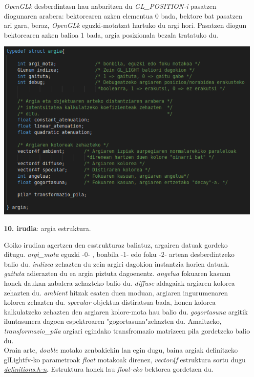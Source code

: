 \documentclass[12pt]{article}
\newcommand{\fitxategi}[1] {\underline{\textit{#1}}}
\newcommand{\aldagai}[1] {\textit{#1}}
\begin{document}
\aldagai{OpenGLk} desberdintasn hau nabaritzen du \aldagai{GL\_POSITION-i} pasatzen diogunaren arabera: bektorearen azken elementua 0 bada, bektore bat pasatzen ari gara, beraz, \aldagai{OpenGLk} eguzki-motatzat hartuko du argi hori. Pasatzen diogun bektorearen azken balioa 1 bada, argia posizionala bezala tratatuko du.\\

\begin{center}
\includegraphics[scale=2.5]{argia_estruktura.png}

\textbf{10. irudia}: argia estruktura.
\end{center}

Goiko irudian agertzen den esstrukturaz baliatuz, argairen datuak gordeko ditugu. \aldagai{argi\_mota} eguzki -0- , bonbila -1- edo foku -2- artean desberdintzeko balio du. \aldagai{indizea} zehazten du zein argiri dagokion instantzia horien datuak. \aldagai{gaituta} adierazten du ea argia piztuta dagoenentz. \aldagai{angelua} fokuaren kasuan honek daukan zabalera zehazteko balio du. \aldagai{diffuse} aldagaiak argiaren kolorea zehazten du. \aldagai{ambient} hitzak esaten duen moduan, argiaren ingurumenaren kolorea zehazten du. \aldagai{specular} objektua distiratsua bada, honen kolorea kalkulatzeko zehazten den argiaren kolore-mota hau balio du. \aldagai{gogortasuna} argitik iluntasunera dagoen espektroaren "gogortasuna"zehazten du. Amaitzeko, \aldagai{transformazio\_pila} argiari egindako transfromazio matrizeen pila gordetzeko balio du.\\

Orain arte, \aldagai{double} motako zenbakiekin lan egin dugu, baina argiak definitzeko glLightfv-ko parametroak \aldagai{float} motakoak direnez, \aldagai{vector4f} estruktura sortu dugu \fitxategi{definitions.h-n}. Estruktura honek lau \aldagai{float-eko} bektorea gordetzen du.\\
\end{document}
